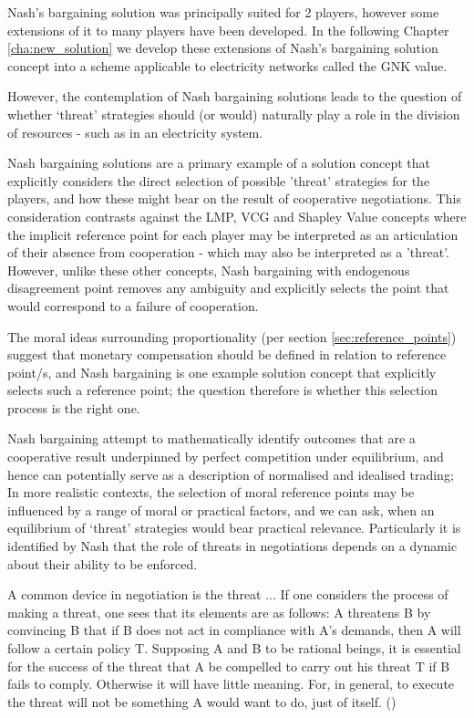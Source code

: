Nash's bargaining solution was principally suited for 2 players, however some extensions of it to many players have been developed.%
In the following Chapter \ref{cha:new_solution} we develop these extensions of Nash's bargaining solution concept into a scheme applicable to electricity networks called the GNK value.

However, the contemplation of Nash bargaining solutions leads to the question of whether `threat' strategies should (or would) naturally play a role in the division of resources - such as in an electricity system.

Nash bargaining solutions are a primary example of a solution concept that explicitly considers the direct selection of possible 'threat' strategies for the players, and how these might bear on the result of cooperative negotiations.
This consideration contrasts against the LMP, VCG and Shapley Value concepts where the implicit reference point for each player may be interpreted as an articulation of their absence from cooperation - which may also be interpreted as a 'threat'.
However, unlike these other concepts, Nash bargaining with endogenous disagreement point removes any ambiguity and explicitly selects the point that would correspond to a failure of cooperation.

The moral ideas surrounding proportionality (per section \ref{sec:reference_points}) suggest that monetary compensation should be defined in relation to reference point/s, and Nash bargaining is one example solution concept that explicitly selects such a reference point; the question therefore is whether this selection process is the right one.

Nash bargaining attempt to mathematically identify outcomes that are a cooperative result underpinned by perfect competition under equilibrium, and hence can potentially serve as a description of normalised and idealised trading;
In more realistic contexts, the selection of moral reference points may be influenced by a range of moral or practical factors, and we can ask, when an equilibrium of `threat' strategies would bear practical relevance.
Particularly it is identified by Nash that the role of threats in negotiations depends on a dynamic about their ability to be enforced.

\begin{displayquote}
A common device in negotiation is the threat ... If one considers the process of making a threat, one sees that its elements are as follows: A threatens B by convincing B that if B does not act in compliance with A's demands, then A will follow a certain policy T. Supposing A and B to be rational beings, it is essential for the success of the threat that A be compelled to carry out his threat T if B fails to comply. Otherwise it will have little meaning. For, in general, to execute the threat will not be something A would want to do, just of itself.
(\cite{nash2})
\end{displayquote}


